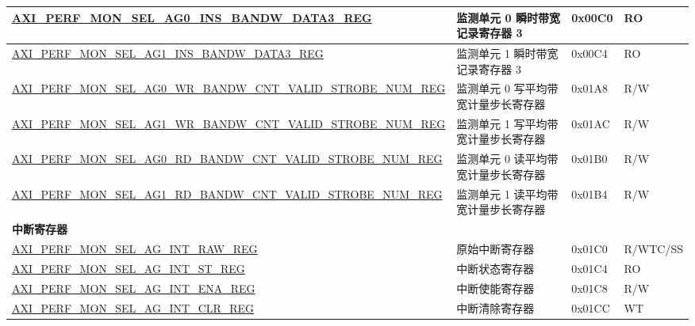 \begin{longtable}{ | p{9.1cm} | p{5cm} | p{1.3cm} | p{1.3cm} | }
\hyperref[regdesc:AXIPERFMONSELAGNINSBANDWDATAMREG]{AXI\_PERF\_MON\_SEL\_AG0\_INS\_BANDW\_DATA3\_REG} & 监测单元 0 瞬时带宽记录寄存器 3 & 0x00C0 & RO\\ \hline
\hyperref[regdesc:AXIPERFMONSELAGNINSBANDWDATAMREG]{AXI\_PERF\_MON\_SEL\_AG1\_INS\_BANDW\_DATA3\_REG} & 监测单元 1 瞬时带宽记录寄存器 3 & 0x00C4 & RO\\ \hline
\hyperref[regdesc:AXIPERFMONSELAGNWRBANDWCNTVALIDSTROBENUMREG]{AXI\_\-PERF\_\-MON\_\-SEL\_\-AG0\_\-WR\_\-BANDW\_\-CNT\_\-VALID\_\-STROBE\_\-NUM\_\-REG} & 监测单元 0 写平均带宽计量步长寄存器 & 0x01A8 & R/W\\ \hline
\hyperref[regdesc:AXIPERFMONSELAGNWRBANDWCNTVALIDSTROBENUMREG]{AXI\_\-PERF\_\-MON\_\-SEL\_\-AG1\_\-WR\_\-BANDW\_\-CNT\_\-VALID\_\-STROBE\_\-NUM\_\-REG} & 监测单元 1 写平均带宽计量步长寄存器 & 0x01AC & R/W\\ \hline
\hyperref[regdesc:AXIPERFMONSELAGNRDBANDWCNTVALIDSTROBENUMREG]{AXI\_\-PERF\_\-MON\_\-SEL\_\-AG0\_\-RD\_\-BANDW\_\-CNT\_\-VALID\_\-STROBE\_\-NUM\_\-REG} & 监测单元 0 读平均带宽计量步长寄存器 & 0x01B0 & R/W\\ \hline
\hyperref[regdesc:AXIPERFMONSELAGNRDBANDWCNTVALIDSTROBENUMREG]{AXI\_\-PERF\_\-MON\_\-SEL\_\-AG1\_\-RD\_\-BANDW\_\-CNT\_\-VALID\_\-STROBE\_\-NUM\_\-REG} & 监测单元 1 读平均带宽计量步长寄存器 & 0x01B4 & R/W\\ \hline
\multicolumn{4}{|l|}{\textbf{中断寄存器}} \\ \hline
\hyperref[regdesc:AXIPERFMONSELAGINTRAWREG]{AXI\_PERF\_MON\_SEL\_AG\_INT\_RAW\_REG} & 原始中断寄存器 & 0x01C0 & R/WTC/SS\\ \hline
\hyperref[regdesc:AXIPERFMONSELAGINTSTREG]{AXI\_PERF\_MON\_SEL\_AG\_INT\_ST\_REG} & 中断状态寄存器 & 0x01C4 & RO\\ \hline
\hyperref[regdesc:AXIPERFMONSELAGINTENAREG]{AXI\_PERF\_MON\_SEL\_AG\_INT\_ENA\_REG} & 中断使能寄存器 & 0x01C8 & R/W\\ \hline
\hyperref[regdesc:AXIPERFMONSELAGINTCLRREG]{AXI\_PERF\_MON\_SEL\_AG\_INT\_CLR\_REG} & 中断清除寄存器 & 0x01CC & WT\\ \hline
\end{longtable}
